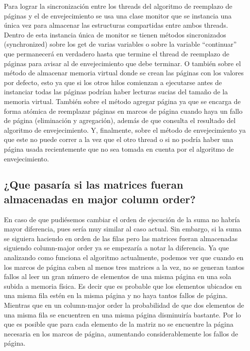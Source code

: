 \documentclass[a4paper]{article}
\begin{document}
Para lograr la sincronización entre los threads del algoritmo de reemplazo de páginas y el de envejecimiento se usa una clase monitor que se instancia una única vez para almacenar las estructuras compartidas entre ambos threads. Dentro de esta instancia única de monitor se tienen métodos sincronizados (synchronized) sobre los get de varias variables o sobre la variable “continuar” que permanecerá en verdadero hasta que termine el thread de reemplazo de páginas para avisar al de envejecimiento que debe terminar. O también sobre el método de almacenar memoria virtual donde se crean las páginas con los valores por defecto, esto ya que si los otros hilos comienzan a ejecutarse antes de instanciar todas las páginas podrían haber lecturas sucias del tamaño de la memoria virtual. También sobre el método agregar página ya que se encarga de forma atómica de reemplazar páginas en marcos de página cuando haya un fallo de página (eliminación y agregación), además de que consulta el resultado del algoritmo de envejecimiento. Y, finalmente, sobre el método de envejecimiento ya que este no puede correr a la vez que el otro thread o si no podría haber una página usada recientemente que no sea tomada en cuenta por el algoritmo de envejecimiento.

\subsection{¿Que pasaría si las matrices fueran almacenadas en major column order?}
En caso de que pudiésemos cambiar el orden de ejecución de la suma no habría mayor diferencia, pues sería muy similar al caso actual. Sin embargo, si la suma se siguiera haciendo en orden de las filas pero las matrices fueran almacenadas siguiendo column-major order ya se empezaría a notar la diferencia. Ya que analizando como funciona el algoritmo actualmente, podemos ver que cuando en los marcos de página caben al menos tres matrices a la vez, no se generan tantos fallos al leer un gran número de elementos de una misma página en una sola subida a memoria física. Es decir que es probable que los elementos ubicados en una misma fila estén en la misma página y no haya tantos fallos de página. Mientras que en un column-major order la probabilidad de que dos elementos de una misma fila se encuentren en una misma página disminuiría bastante. Por lo que es posible que para cada elemento de la matriz no se encuentre la página necesaria en los marcos de página, aumentando considerablemente los fallos de página.
\end{document}
